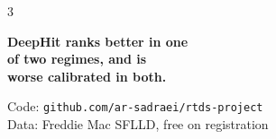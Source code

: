 \documentclass[final]{article}
\begin{document}
\begin{multicols}{3}
\begin{hilite}
\begin{center}
{\fontsize{46}{56}\selectfont\bfseries\color{su}
DeepHit ranks better in one\\[2mm] of two regimes, and is\\[2mm]
worse calibrated in both.}

\vspace{6mm}
{\fontsize{30}{36}\selectfont Code: \texttt{github.com/ar-sadraei/rtds-project}\\[2mm]
Data: Freddie Mac SFLLD, free on registration}
\end{center}
\end{hilite}

\end{multicols}
\end{document}
